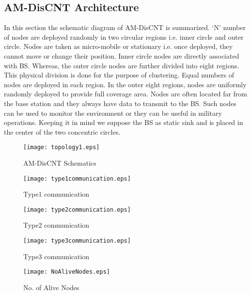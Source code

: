 \documentclass[journal]{IEEEtran}
\begin{document}
\subsection{AM-DisCNT Architecture}
 In this section the schematic diagram of AM-DisCNT is summarized. ‘N’ number of nodes are deployed randomly in two circular regions i.e. inner circle and outer circle. Nodes are taken as micro-mobile or stationary i.e. once deployed, they cannot move or change their position. Inner circle nodes are directly associated with BS. Whereas, the outer circle nodes are further divided into eight regions. This physical division is done for the purpose of clustering. Equal numbers of nodes are deployed in each region. In the outer eight regions, nodes are uniformly randomly deployed to provide full coverage area.
 Nodes are often located far from the base station and they always have data to transmit to the BS. Such nodes can be used to monitor the environment or they can be useful in military operations. Keeping it in mind we suppose the BS as static sink and is placed in the center of the two concentric circles.
\begin{figure*}[ht]
\begin{center}
\texttt{[image: topology1.eps]}
\caption{AM-DisCNT Schematics}
\end{center}
\end{figure*}

\begin{figure}[ht]
\begin{center}
\texttt{[image: type1communication.eps]}
\caption{Type1 communication }
\end{center}
\end{figure}

\begin{figure}[ht]
\begin{center}
\texttt{[image: type2communication.eps]}
\caption{Type2 communication }
\end{center}
\end{figure}

\begin{figure}[ht]
\begin{center}
\texttt{[image: type3communication.eps]}
\caption{Type3 communication }
\end{center}
\end{figure}


\begin{figure}[ht]
\begin{center}
\texttt{[image: NoAliveNodes.eps]}
\vspace{-0.7cm}
\caption{No. of Alive Nodes}
\end{center}
\end{figure}
\end{document}
